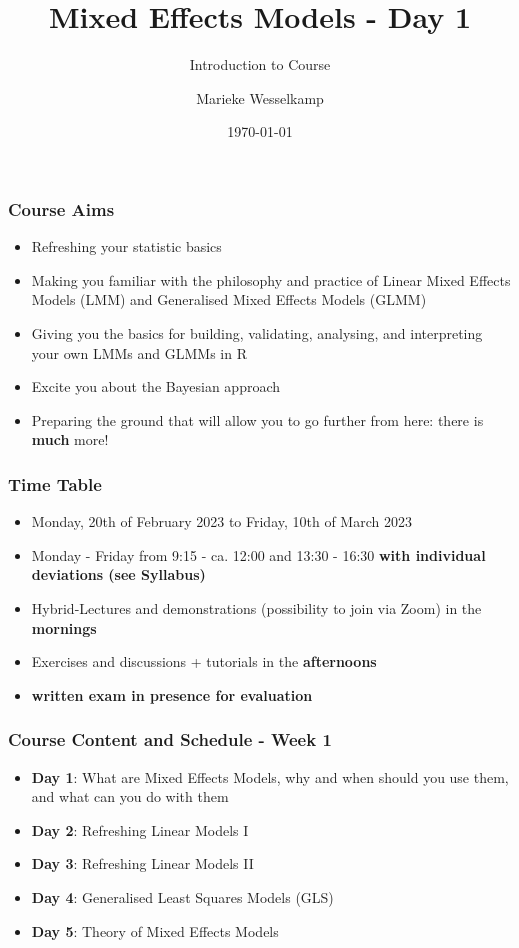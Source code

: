 \documentclass{beamer}
\title{Mixed Effects Models - Day 1}
\subtitle{Introduction to Course}
\author{Marieke Wesselkamp}
\institute{Department of Biometry and Environmental Systems Analysis \\
Albert-Ludwigs-University of Freiburg (Germany)}
\date{\today}
\begin{document}
\frame{\titlepage}

\begin{frame}
\frametitle{Course Aims}
\begin{itemize}
    \item Refreshing your statistic basics
    \item Making you familiar with the philosophy and practice of Linear Mixed Effects Models (LMM) and Generalised Mixed Effects Models (GLMM)
    \item Giving you the basics for building, validating, analysing, and interpreting your own LMMs and GLMMs in R
    \item Excite you about the Bayesian approach
    \item Preparing the ground that will allow you to go further from here: there is \textbf{much} more!
\end{itemize}
\end{frame}

\begin{frame}
\frametitle{Time Table}
\begin{itemize}
    \item Monday, 20th of February 2023 to Friday, 10th of March 2023
    \item Monday - Friday from 9:15 - ca. 12:00 and 13:30 - 16:30 \textbf{with individual deviations (see Syllabus)}
    \item Hybrid-Lectures and demonstrations (possibility to join via Zoom) in the \textbf{mornings}
    \item Exercises and discussions + tutorials in the \textbf{afternoons}
    \item \textbf{written exam in presence for evaluation}
\end{itemize}
\end{frame}

\begin{frame}
\frametitle{Course Content and Schedule - Week 1}
\begin{itemize}
    \item \textbf{Day 1}: What are Mixed Effects Models, why and when should you use them, and what can you do with them
    \item \textbf{Day 2}: Refreshing Linear Models I
    \item \textbf{Day 3}: Refreshing Linear Models II
    \item \textbf{Day 4}: Generalised Least Squares Models (GLS)
    \item \textbf{Day 5}: Theory of Mixed Effects Models
\end{itemize}
\end{frame}
\end{document}
